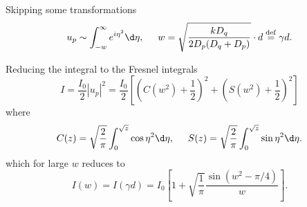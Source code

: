 Skipping some transformations
\begin{equation*}
    u_p \sim \int_{-w}^{\infty} e^{i \eta^2} \d \eta,
    \hspace{0.5 cm}
    w =  \sqrt{\frac{k D_q}{2 D_p (D_q + D_p)}} \cdot d \overset{\mathrm{def}}{=}  \gamma d.
\end{equation*}

Reducing the integral to the Fresnel integrals
\begin{equation*}
    I = \frac{I_0}{2} |u_p|^2 = \frac{I_0}{2} \left[
        \left(C(w^2)+\frac{1}{2}\right)^2 + \left(S(w^2) + \frac{1}{2}\right)^2
    \right]
\end{equation*}
where
\begin{equation*}
    C(z) = \sqrt{\frac{2}{\pi}} \int_0^{\sqrt{z}} \cos \eta^2 \d \eta,
    \hspace{0.5 cm}
    S(z) = \sqrt{\frac{2}{\pi}} \int_0^{\sqrt{z}} \sin \eta^2 \d \eta.
\end{equation*}
which for large $w$ reduces to
\begin{equation}
    I (w) = I(\gamma d) = I_0 \left[
        1 + \sqrt{\frac{1}{\pi}} \frac{\sin \left(w^2 - \pi/4\right)}{w}
    \right].
\end{equation}